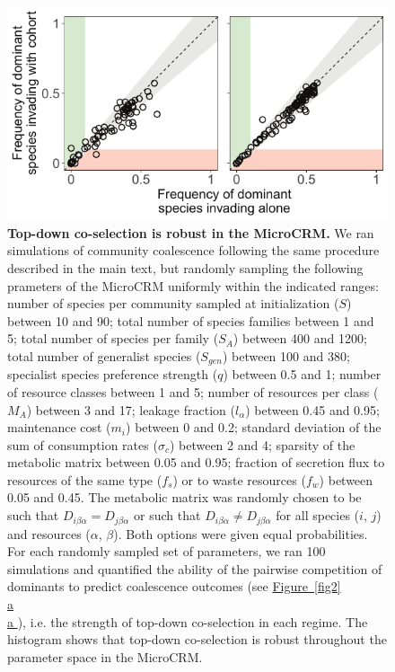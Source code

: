 \documentclass[a4paper,10pt]{article}
\newcommand{\figref}[2][]{%
  \hyperref[{#2}]{%
    Figure~\ref*{#2}%
    \ifx\\#1\\%
    \else
      #1%
    \fi
  }%
}
\begin{document}
\begin{figure}[!h]
\centering
\internallinenumbers
\includegraphics[scale=0.9,keepaspectratio]{figs/figS4.pdf}
\caption{\textbf{Top-down co-selection is robust in the MicroCRM.}
We ran simulations of community coalescence following the same
procedure described in the main text, but randomly sampling the
following prameters of the MicroCRM
uniformly within the indicated ranges:
number of species per community sampled at initialization ($S$) between 10 and 90;
total number of species families between 1 and 5;
total number of species per family ($S_A$) between 400 and 1200;
total number of generalist species ($S_{gen}$) between 100 and 380;
specialist species preference strength ($q$) between 0.5 and 1;
number of resource classes between 1 and 5;
number of resources per class ($M_A$) between 3 and 17;
leakage fraction ($l_{\alpha}$) between 0.45 and 0.95;
maintenance cost ($m_i$) between 0 and 0.2;
standard deviation of the sum of consumption rates ($\sigma_c$) between 2 and 4;
sparsity of the metabolic matrix between 0.05 and 0.95;
fraction of secretion flux to resources of the same type ($f_s$) or to waste resources ($f_w$) between 0.05 and 0.45.
The metabolic matrix was randomly chosen to be such that $D_{i\beta\alpha}=D_{j\beta\alpha}$ or such that
$D_{i\beta\alpha} \neq D_{j\beta\alpha}$ for all species ($i$, $j$) and resources ($\alpha$, $\beta$).
Both options were given equal probabilities.
For each randomly sampled set of parameters, we ran 100 simulations
and quantified the ability of the pairwise competition
of dominants to predict coalescence outcomes (see \figref[a]{fig2}), i.e. the strength of top-down co-selection
in each regime.
The histogram shows that top-down co-selection is robust throughout the parameter space in the MicroCRM.}
\label{figSX}
\end{figure}

\clearpage
\end{document}
